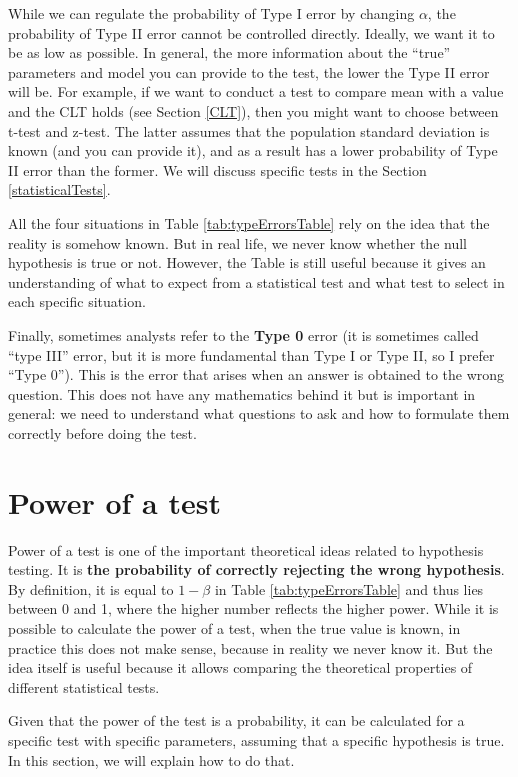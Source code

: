 \documentclass[
]{book}
\theoremstyle{definition}
\theoremstyle{definition}
\theoremstyle{definition}
\theoremstyle{definition}
\theoremstyle{remark}
\begin{document}
While we can regulate the probability of Type I error by changing \(\alpha\), the probability of Type II error cannot be controlled directly. Ideally, we want it to be as low as possible. In general, the more information about the ``true'' parameters and model you can provide to the test, the lower the Type II error will be. For example, if we want to conduct a test to compare mean with a value and the CLT holds (see Section \ref{CLT}), then you might want to choose between t-test and z-test. The latter assumes that the population standard deviation is known (and you can provide it), and as a result has a lower probability of Type II error than the former. We will discuss specific tests in the Section \ref{statisticalTests}.

All the four situations in Table \ref{tab:typeErrorsTable} rely on the idea that the reality is somehow known. But in real life, we never know whether the null hypothesis is true or not. However, the Table is still useful because it gives an understanding of what to expect from a statistical test and what test to select in each specific situation.

Finally, sometimes analysts refer to the \textbf{Type 0} error (it is sometimes called ``type III'' error, but it is more fundamental than Type I or Type II, so I prefer ``Type 0''). This is the error that arises when an answer is obtained to the wrong question. This does not have any mathematics behind it but is important in general: we need to understand what questions to ask and how to formulate them correctly before doing the test.

\hypertarget{powerOfTheTest}{%
\section{Power of a test}\label{powerOfTheTest}}

Power of a test is one of the important theoretical ideas related to hypothesis testing. It is \textbf{the probability of correctly rejecting the wrong hypothesis}. By definition, it is equal to \(1-\beta\) in Table \ref{tab:typeErrorsTable} and thus lies between 0 and 1, where the higher number reflects the higher power. While it is possible to calculate the power of a test, when the true value is known, in practice this does not make sense, because in reality we never know it. But the idea itself is useful because it allows comparing the theoretical properties of different statistical tests.

Given that the power of the test is a probability, it can be calculated for a specific test with specific parameters, assuming that a specific hypothesis is true. In this section, we will explain how to do that.
\end{document}
